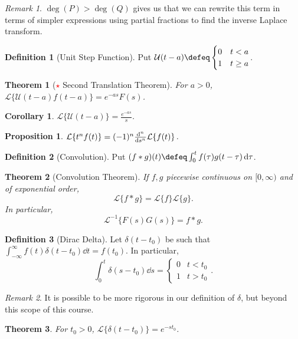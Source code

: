 \documentclass[12pt, oneside]{article}
\newcommand{\laplace}[1]{\mathcal{L}\{#1\}}
\newcommand{\ilaplace}[1]{\mathcal{L}^{-1}\{#1\}}
\newcommand{\unit}[1]{\mathcal{U}(#1)}
\theoremstyle{definition}
\newtheorem{defn}{Definition}
\theoremstyle{plain}
\newtheorem{thm}{Theorem}
\newtheorem{cor}{Corollary}
\newtheorem{prop}{Proposition}
\theoremstyle{remark}
\newtheorem{remark}{Remark}
\begin{document}
\begin{remark}
  $\deg(P) > \deg(Q)$ gives us that we can rewrite this term in terms of simpler expressions using partial fractions to find the inverse Laplace transform.
\end{remark}

\begin{defn}[Unit Step Function]
  Put $\unit{t - a} \defeq \begin{cases}
    0 & t < a\\
    1 & t \geq a
  \end{cases}$.
\end{defn}
\begin{thm}[\textcolor{red}{$\star$} Second Translation Theorem]
For $a > 0$, $\laplace{\unit{t - a} f(t - a)} = e^{-as} F(s)$.
\end{thm}
\begin{cor}
  $\laplace{\unit{t - a}} = \frac{e^{-as}}{s}$.
\end{cor}

\begin{prop}
  $\laplace{t^n f(t)} = (-1)^n \dv[n]{s} \laplace{f(t)}$.
\end{prop}

\begin{defn}[Convolution]
  Put $(f \ast g)(t) \defeq \int_0^t f(\tau) g(t - \tau) \dd{\tau}$.
\end{defn}

\begin{thm}[Convolution Theorem]
  If $f, g$ piecewise continuous on $[0, \infty)$ and of exponential order, \[
  \laplace{f \ast g} = \laplace{f}\laplace{g}.  
  \]
  In particular, \[
  \ilaplace{F(s)G(s)} = f \ast g.  
  \]
\end{thm}

\begin{defn}[Dirac Delta]
  Let $\delta(t - t_0)$ be such that $\int_{-\infty}^\infty f(t) \delta(t - t_0) \dd{t} = f(t_0)$. In particular, \[
  \int_0^t \delta(s - t_0) \dd{s} = \begin{cases}
    0 & t < t_0\\
    1 & t > t_0
  \end{cases}  .
  \]
\end{defn}

\begin{remark}
  It is possible to be more rigorous in our definition of $\delta$, but beyond this scope of this course.
\end{remark}

\begin{thm}
  For $t_0 > 0$, $\laplace{\delta(t - t_0)} = e^{-st_0}$.
\end{thm}
\end{document}
